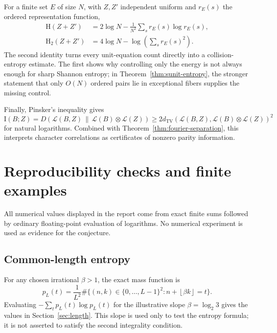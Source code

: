 \documentclass[11pt,oneside]{article}
\theoremstyle{definition}
\theoremstyle{remark}
\newcommand{\HH}{\mathrm{H}}
\newcommand{\II}{\mathrm{I}}
\newcommand{\TV}{d_{\mathrm{TV}}}
\newcommand{\floor}[1]{\left\lfloor #1\right\rfloor}
\begin{document}
For a finite set \(E\) of size \(N\), with \(Z,Z'\) independent uniform and \(r_E(s)\) the ordered representation function,
\begin{align}
 \HH(Z+Z')&=2\log N-\frac1{N^2}\sum_s r_E(s)\log r_E(s),\label{eq:shannon-rep}\\
 \HH_2(Z+Z')&=4\log N-\log\left(\sum_s r_E(s)^2\right).
 \label{eq:collision-rep}
\end{align}
The second identity turns every unit-equation count directly into a collision-entropy estimate.  The first shows why controlling only the energy is not always enough for sharp Shannon entropy; in Theorem~\ref{thm:sunit-entropy}, the stronger statement that only \(O(N)\) ordered pairs lie in exceptional fibers supplies the missing control.

Finally, Pinsker's inequality gives
\begin{equation}\label{eq:pinsker}
 \II(B;Z)
 =D\!\left(\mathcal L(B,Z)\,\middle\|\,
 \mathcal L(B)\otimes\mathcal L(Z)\right)
 \geq2\TV\!\left(\mathcal L(B,Z),
 \mathcal L(B)\otimes\mathcal L(Z)\right)^2
\end{equation}
for natural logarithms.  Combined with Theorem~\ref{thm:fourier-separation}, this interprets character correlations as certificates of nonzero parity information.

\section{Reproducibility checks and finite examples}\label{app:computations}

All numerical values displayed in the report come from exact finite sums followed by ordinary floating-point evaluation of logarithms.  No numerical experiment is used as evidence for the conjecture.

\subsection{Common-length entropy}

For any chosen irrational \(\beta>1\), the exact mass function is
\begin{equation}\label{eq:finite-length-mass}
 p_L(t)=\frac1{L^2}\#\{(n,k)\in\{0,\ldots,L-1\}^2:
 n+\floor{\beta k}=t\}.
\end{equation}
Evaluating \(-\sum_tp_L(t)\log p_L(t)\) for the illustrative slope \(\beta=\log_2 3\) gives the values in Section~\ref{sec:length}.  This slope is used only to test the entropy formula; it is not asserted to satisfy the second integrality condition.
\end{document}
